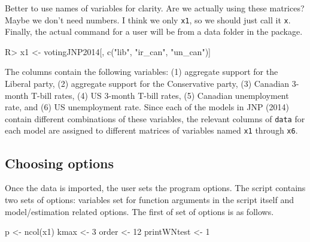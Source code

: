 \documentclass[article]{jss}
\begin{document}
\begin{leftbar}
Better to use names of variables for clarity. 
Are we actually using these matrices? 
Maybe we don't need numbers. 
I think we only \verb|x1|, so we should just call it \verb|x|.
Finally, the actual command for a user will be from a data folder in the package. 
\end{leftbar}
\begin{Code}
R> x1 <- votingJNP2014[, c("lib", "ir_can", "un_can")]
\end{Code}



The columns contain the following variables: (1) aggregate support for the Liberal party, (2) aggregate support for the Conservative party, (3) Canadian 3-month T-bill rates, (4) US 3-month T-bill rates, (5) Canadian unemployment rate, and (6) US unemployment rate. Since each of the models in JNP (2014) contain different combinations of these variables, the relevant columns of \verb|data| for each model are assigned to different matrices of variables named \verb|x1| through \verb|x6|.

\subsection{Choosing options}
\label{subsec choosing options}

Once the data is imported, the user sets the program options. The script contains two sets of options: variables set for function arguments in the script itself and model/estimation related options. 
The first of set of options is as follows. 
% 
\begin{Code}
p               <- ncol(x1) 
kmax            <- 3
order           <- 12
printWNtest     <-  1
\end{Code}
\end{document}
